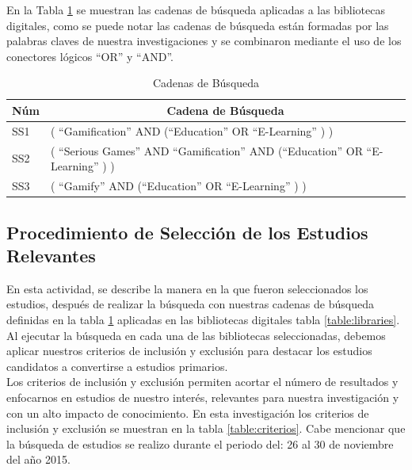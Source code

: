 \documentclass{report}
\begin{document}
            En la Tabla \ref{table:SearchString} se muestran las cadenas de búsqueda aplicadas a las bibliotecas digitales, como se puede notar las cadenas de búsqueda están formadas por las palabras claves de nuestra investigaciones y se combinaron mediante el uso de los conectores lógicos ``OR''{ }y ``AND''.
            \begin{table}[H]
                \begin{center}
                    \caption{Cadenas de Búsqueda}
                    \label{table:SearchString}
                    \begin{tabular}{| p{1.5cm} | p{12.5cm} |}
                        \toprule
                        \hline
                        \multicolumn{1}{|c|}{\textbf{Núm}} & \multicolumn{1}{|c|}{\textbf{Cadena de Búsqueda}} \\
                        \hline
                        SS1 & ( ``Gamification''{ }AND (``Education''{ }OR ``E-Learning''{ }) )\\
                        \hline
                        SS2 & ( ``Serious Games''{ }AND ``Gamification''{ }AND (``Education''{ }OR ``E-Learning''{ }) )\\
                        \hline            
                        SS3 & ( ``Gamify''{ }AND (``Education''{ }OR ``E-Learning''{ }) )\\
                        \hline
                    \end{tabular}
                \end{center}
            \end{table}
    
            \subsection{Procedimiento de Selección de los Estudios Relevantes}
    
	        En esta actividad, se describe la manera en la que fueron seleccionados los estudios, después de realizar la búsqueda con nuestras cadenas de búsqueda definidas en la tabla \ref{table:SearchString} aplicadas en las bibliotecas digitales tabla \ref{table:libraries}. Al ejecutar la búsqueda en cada una de las bibliotecas seleccionadas, debemos aplicar nuestros criterios de inclusión y exclusión para destacar los estudios candidatos a convertirse a estudios primarios.\\
    	    Los criterios de inclusión y exclusión permiten acortar el número de resultados y enfocarnos en estudios de nuestro interés, relevantes para nuestra investigación y con un alto impacto de conocimiento. En esta investigación los criterios de inclusión y exclusión se muestran en la tabla \ref{table:criterios}. Cabe mencionar que la búsqueda de estudios se realizo durante el periodo del: 26 al 30 de noviembre del año 2015.\\
    	    
\end{document}
